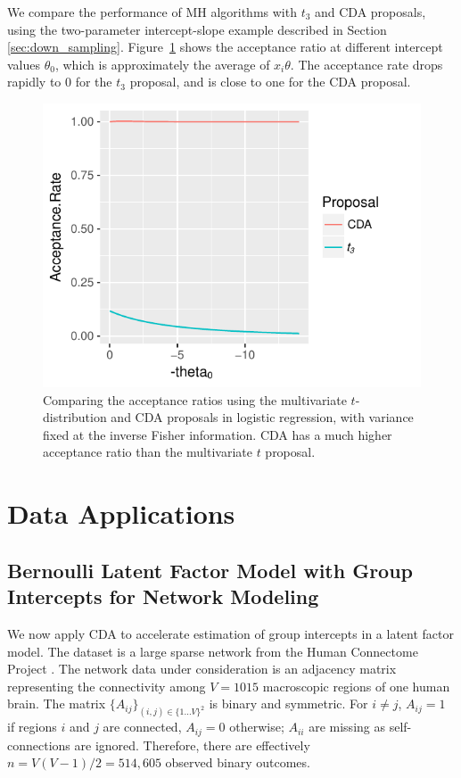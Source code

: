 \documentclass[twoside,11pt]{article}
\newcommand{\1}{\mathbf 1}
\begin{document}
{{ We compare the performance of MH algorithms with $t_3$ and CDA proposals, using the two-parameter intercept-slope example  described in Section \ref{sec:down_sampling}. Figure~\ref{acceptance_rate_tail} shows the acceptance ratio at different intercept values $\theta_0$, which is approximately the average of $x_i\theta$. The acceptance rate drops rapidly to $0$ for the $t_3$ proposal, and is close to one for the CDA proposal.}
 \begin{figure}[H]
 \begin{center}
     \includegraphics[width=0.6\linewidth]{acceptance_rate_mhs2}
 \end{center}
    {\caption{Comparing the acceptance ratios using the multivariate $t$-distribution and CDA proposals in logistic regression, with variance fixed at the inverse Fisher information. CDA has a much higher acceptance ratio than the multivariate $t$ proposal.\label{acceptance_rate_tail}}}
\end{figure}





 \section{Data Applications}


\subsection{{Bernoulli Latent Factor Model with Group Intercepts for Network Modeling}}

We now apply CDA to accelerate estimation of group intercepts in a latent factor model. The dataset is  a large sparse network from the Human Connectome Project \citep{marcus2011informatics}. The network data under consideration is an adjacency matrix representing the connectivity among $V=1015$ macroscopic regions of one human brain. The matrix $\{A_{ij}\}_{(i,j) \in\{1\ldots V\}^2}$ is binary and symmetric. For $i\neq j$, $A_{ij}=1$ if regions $i$ and $j$ are connected, $A_{ij}=0$ otherwise; $A_{ii}$ are missing as self-connections are ignored. Therefore, there are effectively $n= V(V-1)/2=514,605$ observed binary outcomes.

}
\end{document}
